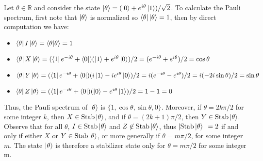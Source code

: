 \documentclass[12pt]{dalthesis}
\begin{document}
\begin{example}
\label{PauliSpecEx}
Let $\theta \in \mathbb{R}$ and consider the state $\ket{\theta} = (\ket{0} + e^{i\theta}\ket{1})/\sqrt{2}$. To calculate the Pauli spectrum, first note that $\ket{\theta}$ is normalized so $\bra{\theta}\ket{\theta} = 1$, then by direct computation we have:
\begin{itemize}
\item $\bra{\theta}I\ket{\theta} = \braket{\theta|\theta} = 1$
\item $\bra{\theta}X\ket{\theta} = (\bra{1}e^{-i\theta} + \bra{0})(\ket{1} + e^{i\theta}\ket{0})/2 = (e^{-i\theta} + e^{i\theta})/2 = \cos\theta$
\item $\bra{\theta}Y\ket{\theta} = (\bra{1}e^{-i\theta} + \bra{0})(i\ket{1} - ie^{i\theta}\ket{0})/2 = i(e^{-i\theta} - e^{i\theta})/2 = i(-2i\sin\theta)/2 = \sin\theta$
\item $\bra{\theta}Z\ket{\theta} = (\bra{1}e^{-i\theta} + \bra{0})(\ket{0} - e^{i\theta}\ket{1})/2 = 1 - 1 = 0$
\end{itemize} 
Thus, the Pauli spectrum of $\ket{\theta}$ is $\{1, \cos\theta, \sin\theta, 0\}$. Moreover, if $\theta = 2k\pi /2$ for some integer $k$, then $X \in \text{Stab}\ket{\theta}$, and if $\theta = (2k+1)\pi /2$, then $Y \in \text{Stab}\ket{\theta}$. Observe that for all $\theta$, $I \in \text{Stab}\ket{\theta}$ and $Z \not\in \text{Stab}\ket{\theta}$, thus $|\text{Stab}\ket{\theta}| = 2$ if and only if either $X$ or $Y \in \text{Stab}\ket{\theta}$, or more generally if $\theta = m \pi /2$, for some integer $m$. The state $\ket{\theta}$ is therefore a stabilizer state only for $\theta = m \pi/2$ for some integer m.
\end{example}
\end{document}
